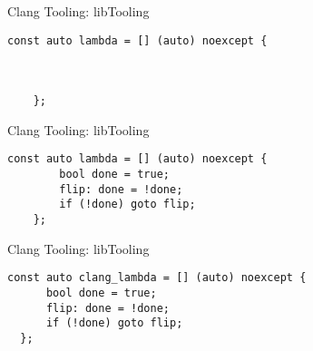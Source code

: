 \begin{frame}[fragile]{Clang Tooling: libTooling}
  \begin{lstlisting}[basicstyle=\large\ttfamily]
    const auto lambda = [] (auto) noexcept {



    };
  \end{lstlisting}
\end{frame}

\begin{frame}[fragile]{Clang Tooling: libTooling}
  \begin{lstlisting}[basicstyle=\large\ttfamily]
    const auto lambda = [] (auto) noexcept {
        bool done = true;
        flip: done = !done;
        if (!done) goto flip;
    };
  \end{lstlisting}
\end{frame}

\begin{frame}[fragile]{Clang Tooling: libTooling}
  \begin{lstlisting}[basicstyle=\large\ttfamily]
  const auto clang_lambda = [] (auto) noexcept {
      bool done = true;
      flip: done = !done;
      if (!done) goto flip;
  };
  \end{lstlisting}
\end{frame}
